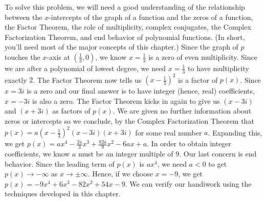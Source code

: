 \begin{exampleSol}

To solve this problem, we will need a good understanding of the relationship between the $x$-intercepts of the graph of a function and the zeros of a function, the Factor Theorem, the role of multiplicity, complex conjugates, the Complex Factorization Theorem, and end behavior of polynomial functions.  (In short, you'll need most of the major concepts of this chapter.)  Since the graph of $p$ touches the $x$-axis at $\left(\frac{1}{3}, 0\right)$, we know $x=\frac{1}{3}$ is a zero of even multiplicity.  Since we are after a polynomial of lowest degree, we need $x=\frac{1}{3}$ to have multiplicity exactly $2$. The Factor Theorem now tells us  $\left(x-\frac{1}{3}\right)^2$ is a factor of $p(x)$.  Since $x=3i$ is a zero and our final answer is to have integer (hence, real) coefficients, $x=-3i$ is also a zero.  The Factor Theorem kicks in again to give us $(x-3i)$ and $(x+3i)$ as factors of $p(x)$.  We are given no further information about zeros or intercepts so we conclude, by the Complex Factorization Theorem that $p(x) = a \left(x-\frac{1}{3}\right)^2 (x-3i)(x+3i)$ for some real number $a$.  Expanding this, we get $p(x) =  ax^4-\frac{2a}{3} x^3+\frac{82a}{9} x^2-6ax+a$.  In order to obtain integer coefficients, we know $a$ must be an integer multiple of $9$.  Our last concern is end behavior.  Since the leading term of $p(x)$ is $ax^4$, we need $a < 0$ to get $p(x) \rightarrow -\infty$ as $x \rightarrow \pm \infty$. Hence, if we choose $x=-9$, we get $p(x) = -9x^4+ 6 x^3 - 82 x^2+54x-9$.    We can verify our handiwork using the techniques developed in this chapter.  


\end{exampleSol}








